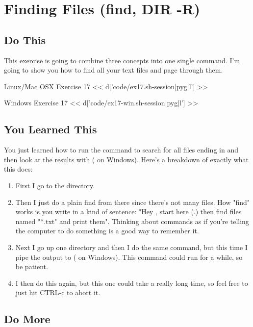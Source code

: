 \chapter{Finding Files (find, DIR -R)}

\section{Do This}

This exercise is going to combine three concepts into one single command.  I'm
going to show you how to find all your text files and page through them.

\begin{code}{Linux/Mac OSX Exercise 17}
<< d['code/ex17.sh-session|pyg|l'] >>
\end{code}

\begin{code}{Windows Exercise 17}
<< d['code/ex17-win.sh-session|pyg|l'] >>
\end{code}

\section{You Learned This}

You just learned how to run the  command to search for all files
ending in  and then look at the results with  ( on Windows).  Here's a breakdown of exactly what this does:

\begin{enumerate}
\item First I go to the  directory.
\item Then I just do a plain find from there since there's not many 
files.  How "find" works is you write in a kind of sentence: "Hey ,
    start here (.) then find files named "*.txt" and print them".  Thinking
    about commands as if you're telling the computer to do something is a good
    way to remember it.
\item Next I go up one directory and then I do the same command, but this time I pipe the output to  ( on Windows).  This command could run for a while, so be patient.
\item I then do this again, but this one could take a really long time, so feel free to just hit CTRL-c to abort it.
\end{enumerate}


\section{Do More}

